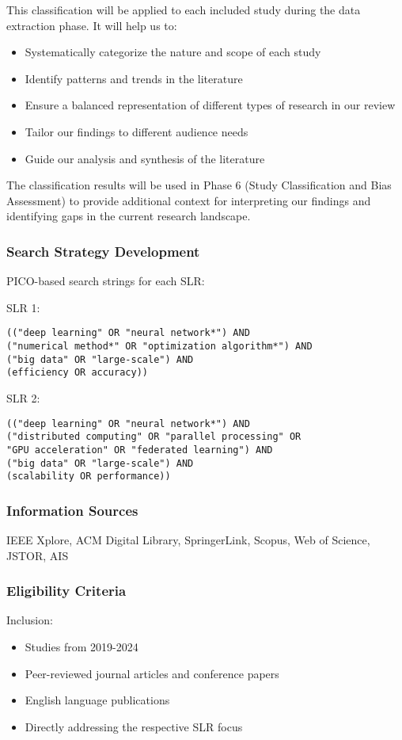 \documentclass[a4paper,12pt]{article}
\begin{document}
This classification will be applied to each included study during the data extraction phase. It will help us to:

\begin{itemize}
    \item Systematically categorize the nature and scope of each study
    \item Identify patterns and trends in the literature
    \item Ensure a balanced representation of different types of research in our review
    \item Tailor our findings to different audience needs
    \item Guide our analysis and synthesis of the literature
\end{itemize}

The classification results will be used in Phase 6 (Study Classification and Bias Assessment) to provide additional context for interpreting our findings and identifying gaps in the current research landscape.

\subsubsection{Search Strategy Development}
PICO-based search strings for each SLR:

SLR 1:
\begin{verbatim}
(("deep learning" OR "neural network*") AND 
("numerical method*" OR "optimization algorithm*") AND 
("big data" OR "large-scale") AND 
(efficiency OR accuracy))
\end{verbatim}

SLR 2:
\begin{verbatim}
(("deep learning" OR "neural network*") AND 
("distributed computing" OR "parallel processing" OR 
"GPU acceleration" OR "federated learning") AND 
("big data" OR "large-scale") AND 
(scalability OR performance))
\end{verbatim}

\subsubsection{Information Sources}
IEEE Xplore, ACM Digital Library, SpringerLink, Scopus, Web of Science, JSTOR, AIS 

\subsubsection{Eligibility Criteria}
Inclusion:
\begin{itemize}
    \item Studies from 2019-2024
    \item Peer-reviewed journal articles and conference papers
    \item English language publications
    \item Directly addressing the respective SLR focus
\end{itemize}
\end{document}
